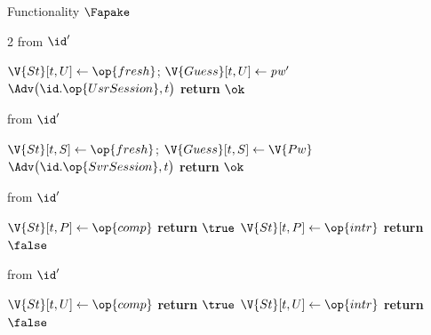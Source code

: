 \begin{interface}[nofloat]{Functionality $\Fapake$ \\
}
{\begin{multicols}{2}
 \quad from $\id'$
\begin{algorithmic}[1]
\algcont
{}
\State $\V{St}[t,U] \gets \op{fresh}$; \quad $\V{Guess}[t,U] \gets \mathit{pw}'$
\State $\Adv\bigl(\id.\op{UsrSession}, t\bigr)$ \label{ln:apakeleaksess}
\State \textbf{return} $\ok$
\algsave
\end{algorithmic}
\vspace{1.4ex}

 \quad from $\id'$
\begin{algorithmic}[1]
\algcont
{}
\State $\V{St}[t,S] \gets \op{fresh}$; \quad $\V{Guess}[t,S] \gets \V{Pw}$
\State $\Adv\bigl(\id.\op{SvrSession}, t\bigr)$
\State \textbf{return} $\ok$
\algsave
\end{algorithmic}
\vspace{1.4ex}

\columnbreak

 \quad from $\id'$
\begin{algorithmic}[1]
\algcont
{} \label{ln:apakeonline}
  \State $\V{St}[t,P] \gets \op{comp}$
  \State \textbf{return} $\true$
\EndIf
\State $\V{St}[t,P] \gets \op{intr}$
\State \textbf{return} $\false$
\algsave
\end{algorithmic}
\vspace{1.4ex}

 \quad from $\id'$
\begin{algorithmic}[1]
\algcont
{}
 \label{ln:apakeimp}
  \State $\V{St}[t,U] \gets \op{comp}$
  \State \textbf{return} $\true$
\EndIf
\State $\V{St}[t,U] \gets \op{intr}$
\State \textbf{return} $\false$
\algsave
\end{algorithmic}
\vspace{1.4ex}


\end{multicols}}
\end{interface}
